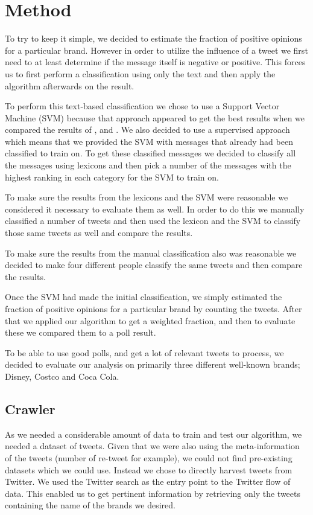 \documentclass[a4paper,12pt]{report}
\begin{document}
\chapter{Method}

To try to keep it simple, we decided to estimate the fraction of positive opinions for a particular brand.
However in order to utilize the influence of a tweet we first need to at least determine if the message itself is negative or positive.
This forces us to first perform a classification using only the text and then apply the algorithm afterwards on the result.

To perform this text-based classification we chose to use a Support Vector Machine (SVM) because that approach appeared to get the best results when we compared the results of \cite{Pang02}, \cite{Turney02} and \cite{Taboada10}.
We also decided to use a supervised approach which means that we provided the SVM with messages that already had been classified to train on.
To get these classified messages we decided to classify all the messages using lexicons and then pick a number of the messages with the highest ranking in each category for the SVM to train on.

To make sure the results from the lexicons and the SVM were reasonable we considered it necessary to evaluate them as well. 
In order to do this we manually classified a number of tweets and then used the lexicon and the SVM to classify those same tweets as well and compare the results.

To make sure the results from the manual classification also was reasonable we decided to make four different people classify the same tweets and then compare the results.

Once the SVM had made the initial classification, we simply estimated the fraction of positive opinions for a particular brand by counting the tweets. After that we applied our algorithm to get a weighted fraction, and then to evaluate these we compared them to a poll result.

To be able to use good polls, and get a lot of relevant tweets to process, we decided to evaluate our analysis on primarily three different well-known brands; Disney, Costco and Coca Cola.

\section{Crawler}

As we needed a considerable amount of data to train and test our algorithm, we needed a dataset of tweets. 
Given that we were also using the meta-information of the tweets (number of re-tweet for example), we could not find pre-existing datasets which we could use.
Instead we chose to directly harvest tweets from Twitter.
We used the Twitter search as the entry point to the Twitter flow of data. 
This enabled us to get pertinent information by retrieving only the tweets containing the name of the brands we desired.
\end{document}
